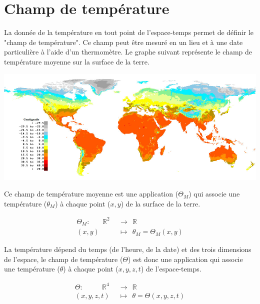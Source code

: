 
\section{Champ de température}
%
La donnée de la température en tout point de l'espace-temps permet de définir le "champ de température". Ce champ peut être mesuré en un lieu et à une date particulière à l'aide d'un thermomètre.
Le graphe suivant représente le champ de température moyenne sur la surface de la terre.

\begin{center}
\includegraphics[scale=.45]{./champs/temperatures}
\end{center}



Ce champ de température moyenne est une application ($\Theta_M$) qui associe une température ($\theta_M$) à chaque point ($x,y$) de la surface de la terre.

\begin{align*}
\Theta_M :\ \ \ \ \ \ \ \ \mathbb{R} ^2 \ \  & \rightarrow \ \ \mathbb{R} \\
(x,y) \ \ & \mapsto \ \ \theta_M = \Theta_M(x,y)
\end{align*}

La température dépend du temps (de l'heure, de la date) et des trois dimensions de l'espace,
le champ de température ($\Theta$) est donc une application qui associe une température ($\theta$) à chaque point ($x,y,z,t$) de l'espace-temps.

\begin{align*}
\Theta :\ \ \ \ \ \ \ \ \ \ \ \ \mathbb{R} ^4 \ \  & \rightarrow \ \ \mathbb{R} \\
(x,y,z,t) \ \ & \mapsto \ \ \theta = \Theta(x,y,z,t)
\end{align*}



